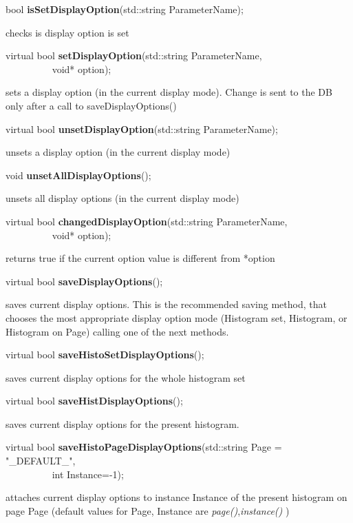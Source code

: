 \item    bool {\bf isSetDisplayOption}(std::string ParameterName);


 checks is display option is set


\item    virtual bool {\bf setDisplayOption}(std::string ParameterName,\\\mbox{}~~~~~~~~~
			void* option);

 sets a display option (in the current display mode). Change is sent to the DB only 
 after a call to saveDisplayOptions()


\item    virtual bool {\bf unsetDisplayOption}(std::string ParameterName);


 unsets a display option (in the current display mode)


\item    void {\bf unsetAllDisplayOptions}();


 unsets all display options (in the current display mode)


\item    virtual bool {\bf changedDisplayOption}(std::string ParameterName,\\\mbox{}~~~~~~~~~ 
				    void* option);

 returns true if the current option value is different from *option


\item    virtual bool {\bf saveDisplayOptions}();


 saves current display options.  This is the recommended saving method, that
 chooses the most appropriate display option mode 
 (Histogram set, Histogram, or Histogram on Page) calling one of the next methods.


\item    virtual bool {\bf saveHistoSetDisplayOptions}();


 saves current display options for the whole histogram set


\item    virtual bool {\bf saveHistDisplayOptions}();


 saves current display options for the present histogram.


\item    virtual bool {\bf saveHistoPageDisplayOptions}(std::string Page = "\_DEFAULT\_",\\\mbox{}~~~~~~~~~
					   int Instance=-1);

 attaches current display options to instance Instance of the present histogram on page 
 Page (default values for Page, Instance are {\it page()},{\it instance()}  )


